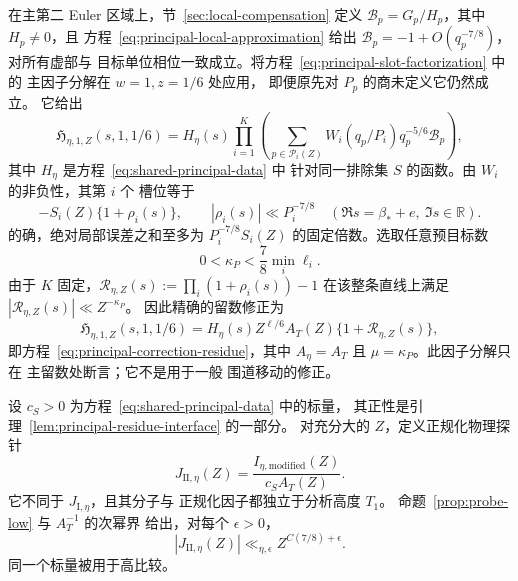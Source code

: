在主第二 Euler 区域上，节~\ref{sec:local-compensation}
定义 \(\mathcal B_p=G_p/H_p\)，其中 \(H_p\ne0\)，且
方程~\eqref{eq:principal-local-approximation} 给出
\(\mathcal B_p=-1+O(q_p^{-7/8})\)，对所有虚部与
目标单位相位一致成立。将方程~\eqref{eq:principal-slot-factorization} 中的
主因子分解在 \(w=1,z=1/6\) 处应用，
即便原先对 \(P_p\) 的商未定义它仍然成立。
它给出
\[
 \mathfrak H_{\eta,1,Z}(s,1,1/6)
 =H_\eta(s)\prod_{i=1}^K
       \left(\sum_{p\in\mathcal P_i(Z)}
           W_i(q_p/P_i)q_p^{-5/6}\mathcal B_p\right),
\]
其中 \(H_\eta\) 是方程~\eqref{eq:shared-principal-data} 中
针对同一排除集 \(S\) 的函数。由 \(W_i\) 的非负性，其第 \(i\) 个
槽位等于
\[
 -S_i(Z)\{1+\rho_i(s)\},\qquad
 |\rho_i(s)|\ll P_i^{-7/8}
 \quad(\Re s=\beta_*+e,\ \Im s\in\mathbb R).
\]
的确，绝对局部误差之和至多为
\(P_i^{-7/8}S_i(Z)\) 的固定倍数。选取任意预目标数
\[
 0<\kappa_P<\frac78\min_i\ell_i.
\]
由于 \(K\) 固定，\(\mathcal R_{\eta,Z}(s):=\prod_i(1+\rho_i(s))-1\)
在该整条直线上满足 \(|\mathcal R_{\eta,Z}(s)|\ll Z^{-\kappa_P}\)。
因此精确的留数修正为
\[
 \mathfrak H_{\eta,1,Z}(s,1,1/6)
 =H_\eta(s)Z^{\ell/6}A_T(Z)\{1+\mathcal R_{\eta,Z}(s)\},
\]
即方程~\eqref{eq:principal-correction-residue}，其中
\(A_\eta=A_T\) 且 \(\mu=\kappa_P\)。此因子分解只在
主留数处断言；它不是用于一般
围道移动的修正。

设 \(c_S>0\) 为方程~\eqref{eq:shared-principal-data} 中的标量，
其正性是引理~\ref{lem:principal-residue-interface} 的一部分。
对充分大的 \(Z\)，定义正规化物理探针
\[
 J_{\mathrm{II},\eta}(Z)
   =\frac{I_{\eta,\mathrm{modified}}(Z)}{c_S A_T(Z)}.
\]
它不同于 \(J_{\mathrm I,\eta}\)，且其分子与
正规化因子都独立于分析高度 \(T_1\)。
命题~\ref{prop:probe-low} 与 \(A_T^{-1}\) 的次幂界
给出，对每个 \(\epsilon>0\)，
\begin{equation}\label{eq:part-II-normalized-low}
 |J_{\mathrm{II},\eta}(Z)|
 \ll_{\eta,\epsilon} Z^{C(7/8)+\epsilon}.
\end{equation}
同一个标量被用于高比较。
